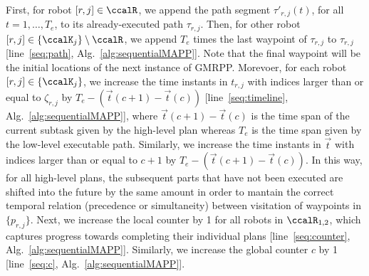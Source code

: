 \documentclass[Afour,sageh,times]{sagej}
\newcommand{\vertex}[1]{v_{\textup{#1}}}
\begin{document}
{{{%

First, for robot $[r, j] \in \ccalR$, we append the path segment $\tau'_{r,j}(t)$, for all $t=1,\ldots, T_e$, to its already-executed path $\tau_{r,j}$. Then, for other robot $[r,j] \in \{\ccalK_j\}\setminus \ccalR$, we  append  $T_e$ times the last waypoint of  $\tau_{r,j}$  to $\tau_{r,j}$ [line~\ref{seq:path}, Alg.~\ref{alg:sequentialMAPP}]. Note that the final waypoint will be the initial locations of the next instance of GMRPP.  Morevoer, for each robot $[r,j] \in \{\ccalK_j\}$, we increase the time instants in $t_{r,j}$ with indices larger than or equal to  $\zeta_{r,j}$ by $T_e - (\vec{t}(c+1) - \vec{t}(c))$ [line~\ref{seq:timeline}, Alg.~\ref{alg:sequentialMAPP}], where $\vec{t}(c+1) - \vec{t}(c)$ is the time span of the current subtask  given by the high-level plan whereas $T_e$ is the time span given by the low-level executable path.
    Similarly, we increase the time instants in $\vec{t}$ with indices larger than or equal to  $c+1$ by $T_e - (\vec{t}(c+1)- \vec{t}(c))$.
    In this way, for all high-level plans, the subsequent parts that have not been executed are shifted into the future by the same amount in order to mantain the correct temporal relation (precedence or simultaneity) between visitation of waypoints in $\{p_{r,j}\}$. Next, we increase  the local counter by 1 for all robots in $\ccalR_{1,2}$, which captures progress towards completing their individual plans [line~\ref{seq:counter}, Alg.~\ref{alg:sequentialMAPP}]. Similarly, we increase the global counter $c$ by 1 [line~\ref{seq:c}, Alg.~\ref{alg:sequentialMAPP}].}


}}
\end{document}
